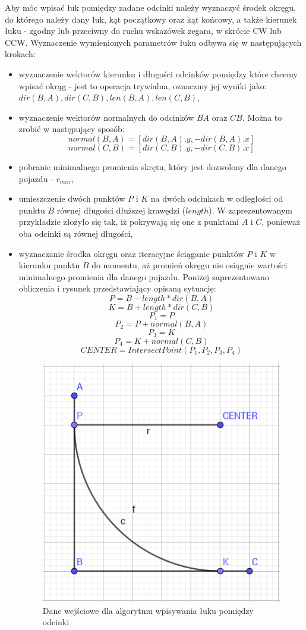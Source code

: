 \documentclass[a4paper,11pt,twoside]{report}
\theoremstyle{definition}
\begin{document}
Aby móc wpisać łuk pomiędzy zadane odcinki należy wyznaczyć środek okręgu, do którego należy dany łuk, kąt początkowy oraz kąt końcowy, a także kierunek łuku - zgodny lub przeciwny do ruchu wskazówek zegara, w skrócie CW lub CCW. Wyznaczenie wymienionych parametrów łuku odbywa się w następujących krokach:
\begin{itemize}
	\item wyznaczenie wektorów kierunku i długości odcinków pomiędzy które chcemy wpisać okrąg - jest to operacja trywialna, oznaczmy jej wyniki jako: $dir(B,A), dir(C,B), len(B,A), len(C,B)$,
	\item wyznaczenie wektorów normalnych do odcinków $BA$ oraz $CB$. Można to zrobić w następujący sposób:
	$$normal(B,A) = [dir(B,A).y, -dir(B,A).x]$$
	$$normal(C,B) = [dir(C,B).y, -dir(C,B).x]$$
	\item pobranie minimalnego promienia skrętu, który jest dozwolony dla danego pojazdu - $r_{min}$,
	\item umieszczenie dwóch punktów $P$ i $K$ na dwóch odcinkach w odległości od punktu $B$ równej długości dłuższej krawędzi ($length$). W zaprezentowanym przykładzie złożyło się tak, iż pokrywają się one z punktami $A$ i $C$, ponieważ oba odcinki są równej długości,
	\item wyznaczanie środka okręgu oraz iteracyjne ściąganie punktów $P$ i $K$ w kierunku punktu $B$ do momentu, aż promień okręgu nie osiągnie wartości minimalnego promienia dla danego pojazdu. Poniżej zaprezentowano obliczenia i rysunek przedstawiający opisaną sytuację:
	$$P = B - length * dir(B,A)$$
	$$K = B + length * dir(C,B)$$
	$$P_{1} = P$$
	$$P_{2} = P + normal(B,A)$$
	$$P_{3} = K$$
	$$P_{4} = K + normal(C,B)$$
	$$CENTER = IntersectPoint(P_{1}, P_{2}, P_{3}, P_{4})$$

\begin{figure}[h!]
\centering
\includegraphics[scale=0.35]{arcsAlgorithmStep2}
\caption[Dane wejściowe dla algorytmu wpisywania łuku pomiędzy odcinki]{Dane wejściowe dla algorytmu wpisywania łuku pomiędzy odcinki}
\end{figure}


\end{itemize}
\end{document}
